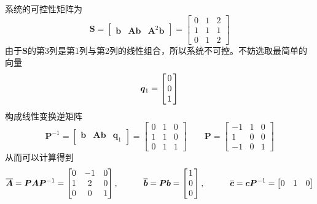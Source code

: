 \solve 系统的可控性矩阵为
\begin{equation*}
	\bm{S} = 
	\begin{bmatrix}
		\bm{b} & \bm{Ab} & \bm{A}^2\bm{b}
	\end{bmatrix}
	= 
	\begin{bmatrix}
		0 & 1 & 2\\
		1 & 1 & 1\\
		0 & 1 & 2
	\end{bmatrix}
\end{equation*}
由于$\bm{S}$的第3列是第1列与第2列的线性组合，所以系统不可控。不妨选取最简单的向量
\begin{equation*}
	\bm{q}_1 =
	\begin{bmatrix}
		\hspace*{0.5mm}0\hspace*{0.5mm}\\
		0\\
		1
	\end{bmatrix}
\end{equation*}
构成线性变换逆矩阵
\begin{equation*}
	\bm{P}^{-1} = 
	\begin{bmatrix}
			\bm{b} & \bm{Ab} & \bm{q}_1
	\end{bmatrix}
	=
	\begin{bmatrix}
		0 & 1 & 0\\
		1 & 1 & 0\\
		0 & 1 & 1
	\end{bmatrix}
	\qquad 
	\bm{P} = 
	\begin{bmatrix}
		-1 & 1 & 0\\
		1& 0 &0\\
		-1 & 0 & 1
	\end{bmatrix}
\end{equation*}
从而可以计算得到
\begin{equation*}
	\overline{\bm{A}} = \bm{PAP}^{-1} =
	\begin{bmatrix}
		0 & -1 & 0\\
		1 & 2 & 0\\
		0 & 0 &1
	\end{bmatrix}
	, \qquad \quad 
	\overline{\bm{b}} = \bm{Pb} = 
	\begin{bmatrix}
		\hspace*{0.5mm} 1 \hspace*{0.5mm}\\
		0 \\
		0 \\
	\end{bmatrix}
	, \qquad\quad 
	\overline{\bm{c}} = \bm{cP}^{-1} = 
	\begin{bmatrix}
		0 & 1 & 0
	\end{bmatrix}
\end{equation*}
